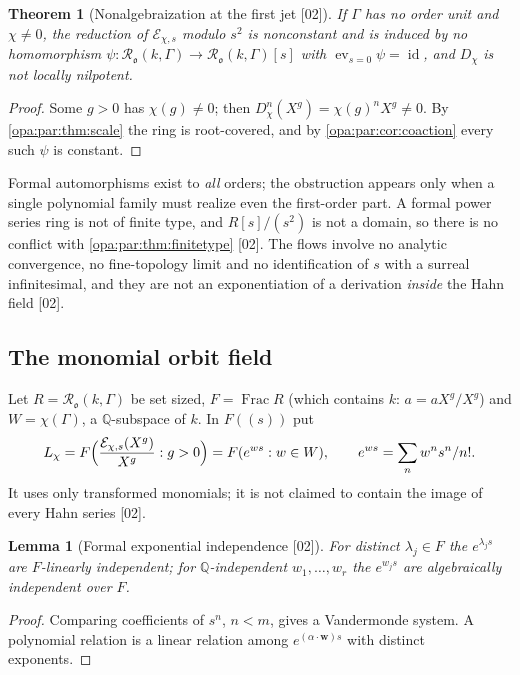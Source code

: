 \documentclass[11pt,oneside]{article}
\numberwithin{equation}{section}
\newtheorem{theorem}{Theorem}[section]
\newtheorem{lemma}[lemma]{Lemma}
\theoremstyle{definition}
\theoremstyle{remark}
\newcommand{\Q}{\mathbb Q}
\newcommand{\oo}{\mathfrak o}
\newcommand{\EE}{\mathcal E}
\newcommand{\id}{\operatorname{id}}
\newcommand{\Frac}{\operatorname{Frac}}
\newcommand{\ev}{\operatorname{ev}}
\newcommand{\src}[1]{\textup{\textsf{\small[#1]}}}
\begin{document}
\begin{theorem}[Nonalgebraization at the first jet \src{02}]\label{opa:par:thm:nonalg}
If $\Gamma$ has no order unit and $\chi\ne0$, the reduction of $\EE_{\chi,s}$ modulo $s^2$
is nonconstant and is induced by no homomorphism
$\psi:\mathcal R_\oo(k,\Gamma)\to\mathcal R_\oo(k,\Gamma)[s]$ with
$\ev_{s=0}\psi=\id$, and $D_\chi$ is not locally nilpotent.
\end{theorem}
\begin{proof}
Some $g>0$ has $\chi(g)\ne0$; then $D_\chi^n(X^g)=\chi(g)^nX^g\ne0$. By
\cref{opa:par:thm:scale} the ring is root-covered, and by \cref{opa:par:cor:coaction}
every such $\psi$ is constant.
\end{proof}

Formal automorphisms exist to \emph{all} orders; the obstruction appears only when a
single polynomial family must realize even the first-order part. A formal power
series ring is not of finite type, and $R[s]/(s^2)$ is not a domain, so there is no
conflict with \cref{opa:par:thm:finitetype} \src{02}. The flows involve no analytic
convergence, no fine-topology limit and no identification of $s$ with a surreal
infinitesimal, and they are not an exponentiation of a derivation \emph{inside} the
Hahn field \src{02}.

\subsection{The monomial orbit field}

Let $R=\mathcal R_\oo(k,\Gamma)$ be set sized, $F=\Frac R$ (which contains $k$:
$a=aX^g/X^g$) and $W=\chi(\Gamma)$, a $\Q$-subspace of $k$. In $F((s))$ put
\begin{equation}\label{opa:par:eq:orbit}
 L_\chi=F\Bigl(\frac{\EE_{\chi,s}(X^g)}{X^g}:g>0\Bigr)=F(e^{ws}:w\in W),
 \qquad e^{ws}=\sum_nw^ns^n/n!.
\end{equation}
It uses only transformed monomials; it is not claimed to contain the image of every
Hahn series \src{02}.

\begin{lemma}[Formal exponential independence \src{02}]\label{opa:par:lem:expindep}
For distinct $\lambda_j\in F$ the $e^{\lambda_js}$ are $F$-linearly independent; for
$\Q$-independent $w_1,\dots,w_r$ the $e^{w_js}$ are algebraically independent over $F$.
\end{lemma}
\begin{proof}
Comparing coefficients of $s^n$, $n<m$, gives a Vandermonde system. A polynomial
relation is a linear relation among $e^{(\alpha\cdot\mathbf w)s}$ with distinct exponents.
\end{proof}
\end{document}
